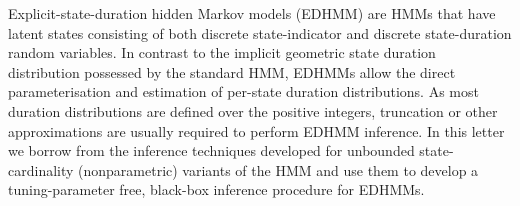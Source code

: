 Explicit-state-duration hidden Markov models (EDHMM) are HMMs that have latent states consisting of both discrete state-indicator and discrete state-duration random variables.  In contrast to the implicit geometric state duration distribution possessed by the standard HMM, EDHMMs allow the direct parameterisation and estimation of per-state duration distributions. As most duration distributions are defined over the positive integers, truncation or other approximations are usually required to perform EDHMM inference.  In this letter we borrow from the inference techniques developed for unbounded state-cardinality (nonparametric) variants of the HMM and use them to develop a tuning-parameter free, black-box inference procedure for EDHMMs.  %
